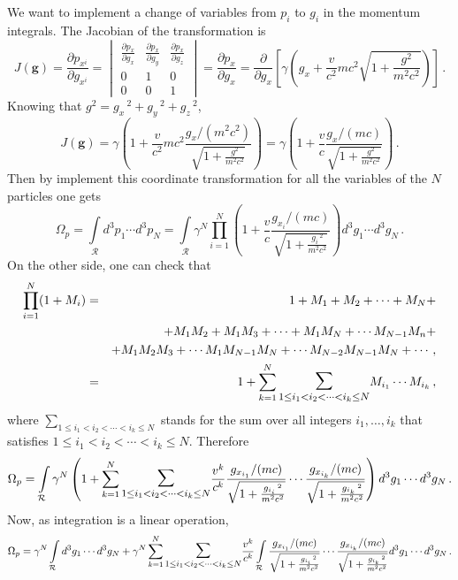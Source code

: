 \documentclass[11pt]{article}
\theoremstyle{definition}     %
\theoremstyle{definition}     %
\def\bigsum{\mathlarger{\mathlarger{\sum}}}
\def\be{\begin{equation}}
\def\ee{\end{equation}}
\newcommand{\partd}[2]{\frac{\partial #1}{\partial #2}}
\begin{document}
We want to implement a change of variables from $p_i$ to $g_i$ in the momentum integrals. The Jacobian of the transformation is 
\be 
	J(\mathbf{g}) = \frac{\partial p_{x^i}}{\partial g_{x^i}} =  \begin{vmatrix}
     \partd{p_x}{g_x} & \partd{p_x}{g_y} & \partd{p_x}{g_z}\\ 
     0 & 1 & 0\\
     0 & 0 & 1  
\end{vmatrix} = \partd{p_x}{g_x} = \partd{ }{g_x}\left[ \gamma \left(g_x + \frac{v}{c^2}mc^2\sqrt{1+\frac{g^2}{m^2c^2}} \right)\right]\,.
\ee
Knowing that $g^2=g_x\,^2+g_y\,^2+g_z\,^2$,
\be 
	J(\mathbf{g}) = \gamma \left( 1 + \frac{v}{c^2}mc^2 \frac{g_x/(m^2c^2)}{\sqrt{1+\frac{g^2}{m^2c^2}}} \right) = \gamma \left( 1 + \frac{v}{c} \frac{g_x/(mc)}{\sqrt{1+\frac{g^2}{m^2c^2}}} \right)\,.
\ee
Then by implement this coordinate transformation for all the variables of the $N$ particles one gets
\be 
	\Omega_p = \int\limits_\mathcal{R} d^3p_1 \cdots d^3p_N = \int\limits_\mathcal{R} \gamma^N \prod\limits_{i=1}^{N}\left( 1 + \frac{v}{c} \frac{g_{x_i}/(mc)}{\sqrt{1+\frac{g_i\,^2}{m^2c^2}}} \right) d^3 g_1 \cdots d^3g_N\,. \label{eq:omega_p}
\ee
On the other side, one can check that
\begin{eqnarray}
	\prod\limits_{i=1}^{N}(1+M_i) &=& 1+M_1+M_2+\cdots+M_N+ \notag  \\  
								 & & +M_1 M_2 +M_1M_3+\cdots+M_1M_N+\cdots M_{N-1}M_n+ \notag \\
								 & & +M_1M_2M_3 +\cdots M_1 M_{N-1}M_N + \cdots M_{N-2}M_{N-1}M_N + \cdots\,, \notag \\
								 &=& 1 + \sum\limits_{k=1}^{N} \bigsum \limits_{1\leq i_1 < i_2 < \cdots < i_k\leq N} M_{i_1}\cdots M_{i_k}\,,
\end{eqnarray}
where $\sum_{1\leq i_1 < i_2 < \cdots < i_k\leq N}$ stands for the sum over all integers $i_1,\dots,i_k$ that satisfies $1\leq i_1 < i_2 < \cdots < i_k\leq N$. Therefore
\be 
	\Omega_p = \int\limits_\mathcal{R} \gamma^N \left( 1 + \sum\limits_{k=1}^{N} \bigsum\limits_{1\leq i_1 < i_2 < \cdots < i_k\leq N} \frac{v^k}{c^k} \frac{g_{x_{i_1}}/(mc)}{\sqrt{1+\frac{g_{i_i}\,^2}{m^2c^2}}} \cdots \frac{g_{x_{i_k}}/(mc)}{\sqrt{1+\frac{g_{i_k}\,^2}{m^2c^2}}} \right) d^3 g_1 \cdots d^3g_N\,.
\ee
Now, as integration is a linear operation,
\be 
	\Omega_p =  \gamma^N \int\limits_\mathcal{R} d^3 g_1 \cdots d^3g_N  + \gamma^N \sum\limits_{k=1}^{N} \bigsum\limits_{1\leq i_1 < i_2 < \cdots < i_k\leq N} \frac{v^k}{c^k} \int\limits_\mathcal{R} \frac{g_{x_{i_1}}/(mc)}{\sqrt{1+\frac{g_{i_i}\,^2}{m^2c^2}}} \cdots \frac{g_{x_{i_k}}/(mc)}{\sqrt{1+\frac{g_{i_k}\,^2}{m^2c^2}}} d^3 g_1 \cdots d^3g_N\,. \label{eq:sums}
\ee
\end{document}
